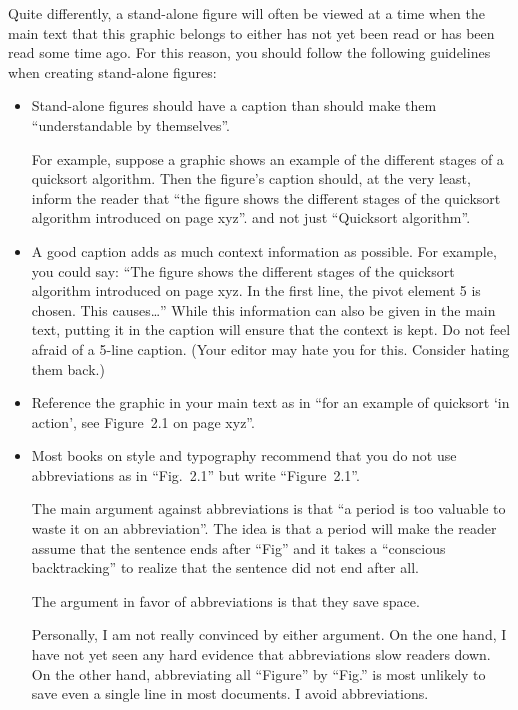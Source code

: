 Quite differently, a stand-alone figure will often be viewed at a time when the
main text that this graphic belongs to either has not yet been read or has been
read some time ago. For this reason, you should follow the following guidelines
when creating stand-alone figures:
%
\begin{itemize}
    \item Stand-alone figures should have a caption than should make them
        ``understandable by themselves''.

        For example, suppose a graphic shows an example of the different
        stages of a quicksort algorithm. Then the figure's caption should, at
        the very least, inform the reader that ``the figure shows the
        different stages of the quicksort algorithm introduced on page xyz''.
        and not just ``Quicksort algorithm''.
    \item A good caption adds as much context information as possible. For
        example, you could say: ``The figure shows the different stages of
        the quicksort algorithm introduced on page xyz. In the first line,
        the pivot element 5 is chosen. This causes\dots'' While this
        information can also be given in the main text, putting it in the
        caption will ensure that the context is kept. Do not feel afraid of a
        5-line caption. (Your editor may hate you for this. Consider hating
        them back.)
    \item Reference the graphic in your main text as in ``for an example of
        quicksort `in action', see Figure~2.1 on page xyz''.
    \item Most books on style and typography recommend that you do not use
        abbreviations as in ``Fig.~2.1'' but write ``Figure~2.1''.

        The main argument against abbreviations is that ``a period is too
        valuable to waste it on an abbreviation''. The idea is that a period
        will make the reader assume that the sentence ends after ``Fig'' and
        it takes a ``conscious backtracking'' to realize that the sentence
        did not end after all.

        The argument in favor of abbreviations is that they save space.

        Personally, I am not really convinced by either argument. On the one
        hand, I have not yet seen any hard evidence that abbreviations slow
        readers down. On the other hand, abbreviating all ``Figure'' by
        ``Fig.'' is most unlikely to save even a single line in most documents.
        I avoid abbreviations.
\end{itemize}


